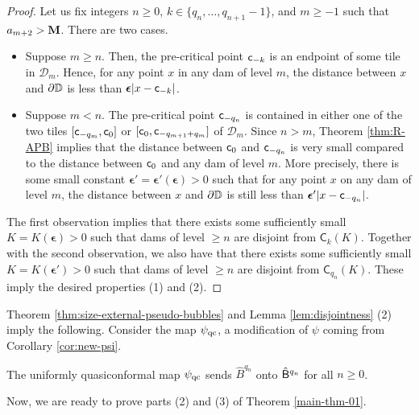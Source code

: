 \documentclass{amsart}
\begin{document}
\begin{proof}
    Let us fix integers $n\geq 0$, $k \in \{q_n, \ldots,q_{n+1}-1\}$, and $m \geq -1$ such that $a_{m+2} > \mathbf{M}$. 
    There are two cases.
    \begin{itemize}
        \item Suppose $m \geq n$. 
        Then, the pre-critical point $\mathsf{c}_{-k}$ is an endpoint of some tile in $\mathcal{D}_m$. 
        Hence, for any point $x$ in any dam of level $m$, the distance between $x$ and $\partial \mathbb{D}$ is less than $\boldsymbol{\epsilon} |x-\mathsf{c}_{-k}|$.
        \item Suppose $m < n$. 
        The pre-critical point $\mathsf{c}_{-q_n}$ is contained in either one of the two tiles $[\mathsf{c}_{-q_m},\mathsf{c}_0]$ or $[\mathsf{c}_0,\mathsf{c}_{-q_{m+1}+q_{m}}]$ of $\mathcal{D}_m$. 
        Since $n > m$, Theorem \ref{thm:R-APB} implies that the distance between $\mathsf{c}_0$ and $\mathsf{c}_{-q_n}$ is very small compared to the distance between $\mathsf{c}_0$ and any dam of level $m$. 
        More precisely, there is some small constant $\boldsymbol{\epsilon}'=\boldsymbol{\epsilon}'( \boldsymbol{\epsilon})>0$ such that for any point $x$ on any dam of level $m$, the distance between $x$ and $\partial \mathbb{D}$ is still less than $\boldsymbol{\epsilon}' |x-\mathsf{c}_{-q_n}|$. 
    \end{itemize}
    The first observation implies that there exists some sufficiently small $K = K(\boldsymbol{\epsilon}) > 0$ such that dams of level $\geq n$ are disjoint from $\mathsf{C}_k(K)$.
    Together with the second observation, we also have that there exists some sufficiently small $K = K(\boldsymbol{\epsilon}') > 0$ such that dams of level $\geq n$ are disjoint from $\mathsf{C}_{q_n}(K)$.
    These imply the desired properties (1) and (2).
\end{proof}

Theorem \ref{thm:size-external-pseudo-bubbles} and Lemma \ref{lem:disjointness} (2) imply the following.
Consider the map $\psi_{\textnormal{qc}}$, a modification of $\psi$ coming from Corollary \ref{cor:new-psi}.

\begin{corollary}
\label{cor:uniform-qc-transfer}
    The uniformly quasiconformal map $\psi_{\textnormal{qc}}$ sends $\hat{B}^{q_n}$ onto $\hat{\mathsf{B}}^{q_n}$ for all $n \geq 0$.
\end{corollary}

Now, we are ready to prove parts (2) and (3) of Theorem \ref{main-thm-01}.
\end{document}
